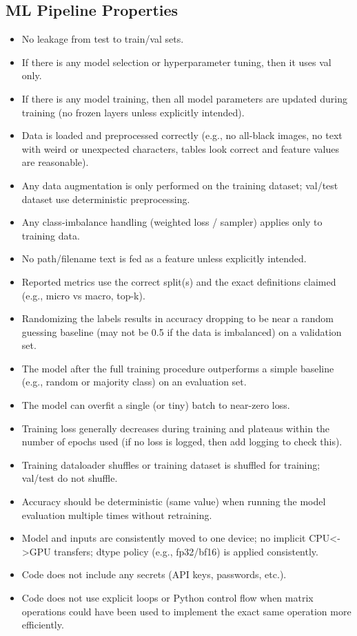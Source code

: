 \documentclass{article}
\theoremstyle{plain}
\theoremstyle{definition}
\theoremstyle{remark}
\begin{document}
\subsection{ML Pipeline Properties}
\begin{itemize}
  \item No leakage from test to train/val sets.
  \item If there is any model selection or hyperparameter tuning, then it uses val only.
  \item If there is any model training, then all model parameters are updated during training (no frozen layers unless explicitly intended).
  \item Data is loaded and preprocessed correctly (e.g., no all-black images, no text with weird or unexpected characters, tables look correct and feature values are reasonable).
  \item Any data augmentation is only performed on the training dataset; val/test dataset use deterministic preprocessing.
  \item Any class-imbalance handling (weighted loss / sampler) applies only to training data.
  \item No path/filename text is fed as a feature unless explicitly intended.
  \item Reported metrics use the correct split(s) and the exact definitions claimed (e.g., micro vs macro, top-k).
  \item Randomizing the labels results in accuracy dropping to be near a random guessing baseline (may not be 0.5 if the data is imbalanced) on a validation set.
  \item The model after the full training procedure outperforms a simple baseline (e.g., random or majority class) on an evaluation set.
  \item The model can overfit a single (or tiny) batch to near-zero loss.
  \item Training loss generally decreases during training and plateaus within the number of epochs used (if no loss is logged, then add logging to check this).
  \item Training dataloader shuffles or training dataset is shuffled for training; val/test do not shuffle.
  \item Accuracy should be deterministic (same value) when running the model evaluation multiple times without retraining.
  \item Model and inputs are consistently moved to one device; no implicit CPU<->GPU transfers; dtype policy (e.g., fp32/bf16) is applied consistently.
  \item Code does not include any secrets (API keys, passwords, etc.).
  \item Code does not use explicit loops or Python control flow when matrix operations could have been used to implement the exact same operation more efficiently.
\end{itemize}
\end{document}
